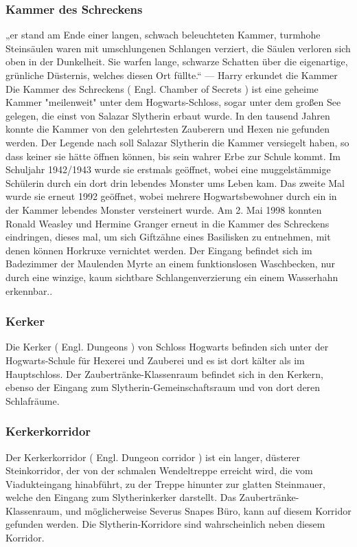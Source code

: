 \documentclass[a4paper, 10pt]{article}
\begin{document}
\subsubsection*{\large Kammer des Schreckens}
„er stand am Ende einer langen, schwach beleuchteten Kammer, turmhohe Steinsäulen waren mit umschlungenen Schlangen verziert, die Säulen verloren sich oben in der Dunkelheit. Sie warfen lange, schwarze Schatten über die eigenartige, grünliche Düsternis, welches diesen Ort füllte.“
\vspace{10pt}
\newline
{}  
— Harry erkundet die Kammer
\vspace{10pt}
\newline
{}  
Die Kammer des Schreckens (  Engl.  Chamber of Secrets ) ist eine geheime Kammer "meilenweit" unter dem Hogwarts-Schloss, sogar unter dem großen See gelegen, die einst von Salazar Slytherin erbaut wurde. In den tausend Jahren konnte die Kammer von den gelehrtesten Zauberern und Hexen nie gefunden werden. Der Legende nach soll Salazar Slytherin die Kammer versiegelt haben, so dass keiner sie hätte öffnen können, bis sein wahrer Erbe zur Schule kommt. Im Schuljahr 1942/1943 wurde sie erstmals geöffnet, wobei eine muggelstämmige Schülerin durch ein dort drin lebendes Monster ums Leben kam. Das zweite Mal wurde sie erneut 1992 geöffnet, wobei mehrere Hogwartsbewohner durch ein in der Kammer lebendes Monster versteinert wurde. Am 2. Mai 1998 konnten Ronald Weasley und Hermine Granger erneut in die Kammer des Schreckens eindringen, dieses mal, um sich Giftzähne eines Basilisken zu entnehmen, mit denen können Horkruxe vernichtet werden.
\vspace{10pt}
\newline
{}  
Der Eingang befindet sich im Badezimmer der Maulenden Myrte an einem funktionslosen Waschbecken, nur durch eine winzige, kaum sichtbare Schlangenverzierung ein einem Wasserhahn erkennbar..
\subsubsection*{\large Kerker}
Die Kerker (  Engl.  Dungeons ) von Schloss Hogwarts befinden sich unter der Hogwarts-Schule für Hexerei und Zauberei und es ist dort kälter als im Hauptschloss. Der Zaubertränke-Klassenraum befindet sich in den Kerkern, ebenso der Eingang zum Slytherin-Gemeinschaftsraum und von dort deren Schlafräume.
\subsubsection*{\large Kerkerkorridor}
Der Kerkerkorridor (  Engl.  Dungeon corridor ) ist ein langer, düsterer Steinkorridor, der von der schmalen Wendeltreppe erreicht wird, die vom Viadukteingang hinabführt, zu der Treppe hinunter zur glatten Steinmauer, welche den Eingang zum Slytherinkerker darstellt. Das Zaubertränke-Klassenraum, und möglicherweise Severus Snapes Büro, kann auf diesem Korridor gefunden werden. Die Slytherin-Korridore sind wahrscheinlich neben diesem Korridor.
\end{document}
